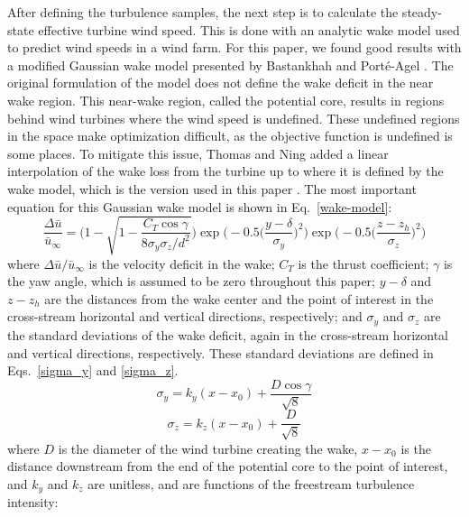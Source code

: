 \documentclass[11pt,letterpaper]{article}
\begin{document}
After defining the turbulence samples, the next step is to calculate the steady-state effective turbine wind speed. This is done with an analytic wake model used to predict wind speeds in a wind farm. For this paper, we found good results with a modified Gaussian wake model presented by Bastankhah and Porté-Agel \cite{bastankhah2016experimental}.
% 
The original formulation of the model does not define the wake deficit in the near wake region. This near-wake region, called the potential core, results in regions behind wind turbines where the wind speed is undefined. These undefined regions in the space make optimization difficult, as the objective function is undefined is some places. To mitigate this issue, Thomas and Ning added a linear interpolation of the wake loss from the turbine up to where it is defined by the wake model, which is the version used in this paper \cite{Thomas2018}. 
The most important equation for this Gaussian wake model is shown in Eq.~\ref{wake-model}:
% 
\begin{equation}
    \label{wake-model}
    \frac{\Delta\bar{u}}{\bar{u}_{\infty}} = \Bigg(1 - \sqrt{1 - \frac{C_T \cos{\gamma}}{8\sigma_y\sigma_z/d^2}}  \Bigg) \exp{\bigg(-0.5\Big(\frac{y-\delta}{\sigma_y} \Big)^2}\bigg) \exp{\bigg(-0.5\Big(\frac{z-z_h}{\sigma_z} \Big)^2}\bigg)
\end{equation}
%
\noindent where $\Delta\bar{u}/\bar{u}_{\infty}$ is the velocity deficit in the wake; $C_T$ is the thrust coefficient; $\gamma$ is the yaw angle, which is assumed to be zero throughout this paper; $y-\delta$ and $z-z_h$ are the distances from the wake center and the point of interest in the cross-stream horizontal and vertical directions, respectively; and $\sigma_y$ and $\sigma_z$ are the standard deviations of the wake deficit, again in the cross-stream horizontal and vertical directions, respectively. These standard deviations are defined in Eqs.~\ref{sigma_y} and \ref{sigma_z}.
%
\begin{equation}
    \label{sigma_y}
    \sigma_y = k_y(x-x_0) + \frac{D\cos{\gamma}}{\sqrt{8}}
\end{equation}
%
\begin{equation}
    \label{sigma_z}
    \sigma_z = k_z(x-x_0) + \frac{D}{\sqrt{8}}
\end{equation}
%
\noindent where $D$ is the diameter of the wind turbine creating the wake, $x-x_0$ is the distance downstream from the end of the potential core to the point of interest, and $k_y$ and $k_z$ are unitless, and are functions of the freestream turbulence intensity:
\end{document}
